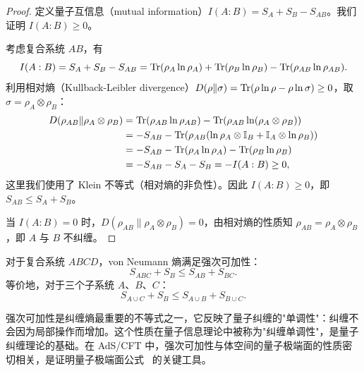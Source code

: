\begin{proof}
定义量子互信息（mutual information）$I(A:B) = S_A + S_B - S_{AB}$。我们证明 $I(A:B) \geq 0$。

考虑复合系统 $AB$，有
\begin{equation}
    I(A:B) = S_A + S_B - S_{AB} = \Tr(\rho_A \ln \rho_A) + \Tr(\rho_B \ln \rho_B) - \Tr(\rho_{AB} \ln \rho_{AB}).
\end{equation}
利用相对熵（Kullback-Leibler divergence）$D(\rho\|\sigma) = \Tr(\rho \ln \rho - \rho \ln \sigma) \geq 0$，取 $\sigma = \rho_A \otimes \rho_B$：
\begin{align}
    D(\rho_{AB} \| \rho_A \otimes \rho_B) &= \Tr(\rho_{AB} \ln \rho_{AB}) - \Tr(\rho_{AB} \ln(\rho_A \otimes \rho_B)) \nonumber\\
    &= -S_{AB} - \Tr(\rho_{AB}(\ln \rho_A \otimes \mathbb{I}_B + \mathbb{I}_A \otimes \ln \rho_B)) \nonumber\\
    &= -S_{AB} - \Tr(\rho_A \ln \rho_A) - \Tr(\rho_B \ln \rho_B) \nonumber\\
    &= -S_{AB} - S_A - S_B = -I(A:B) \geq 0,
\end{align}
这里我们使用了 Klein 不等式（相对熵的非负性）。因此 $I(A:B) \geq 0$，即 $S_{AB} \leq S_A + S_B$。

当 $I(A:B) = 0$ 时，$D(\rho_{AB}\|\rho_A \otimes \rho_B) = 0$，由相对熵的性质知 $\rho_{AB} = \rho_A \otimes \rho_B$，即 $A$ 与 $B$ 不纠缠。
\end{proof}

\begin{theorem}[强次可加性]\label{thm:strong_subadd}
对于复合系统 $ABCD$，von Neumann 熵满足强次可加性：
\begin{equation}
    S_{ABC} + S_B \leq S_{AB} + S_{BC}.
\end{equation}
等价地，对于三个子系统 $A$、$B$、$C$：
\begin{equation}\label{eq:strong_subadd}
    S_{A \cup C} + S_{B} \leq S_{A \cup B} + S_{B \cup C}.
\end{equation}
\end{theorem}

\begin{note}[强次可加性的物理意义]
强次可加性是纠缠熵最重要的不等式之一，它反映了量子纠缠的"单调性"：纠缠不会因为局部操作而增加。这个性质在量子信息理论中被称为"纠缠单调性"，是量子纠缠理论的基础。在 AdS/CFT 中，强次可加性与体空间的量子极端面的性质密切相关，是证明量子极端面公式~\cite{Engelhardt2015} 的关键工具。
\end{note}

